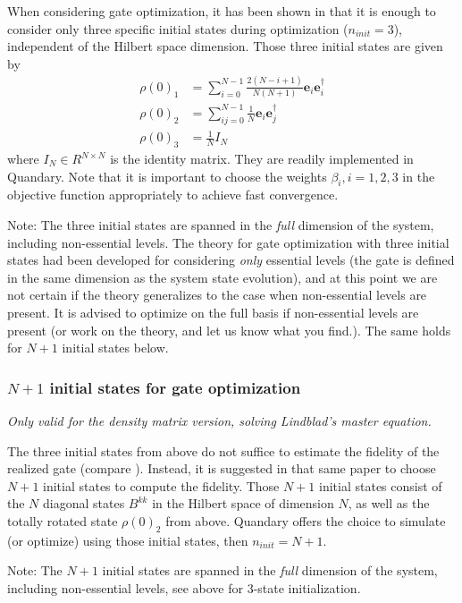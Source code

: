 \documentclass[11pt]{article}
\newcommand{\bs}[1]{{\boldsymbol{#1}}}
\begin{document}
When considering gate optimization, it has been shown in \cite{goerz2014optimal} that it is enough to consider only three specific initial states during optimization ($n_{init}=3$), independent of the Hilbert space dimension. Those three initial states are given by
\begin{align}
    \rho(0)_1 &= \sum_{i=0}^{N-1} \frac{2(N-i+1)}{N(N+1)} \bs{e}_i\bs{e}_i^\dagger \\
    \rho(0)_2 &= \sum_{ij=0}^{N-1} \frac{1}{N} \bs{e}_i\bs{e}_j^\dagger\\
    \rho(0)_3 &= \frac{1}{N} I_N
\end{align}
where $I_N\in R^{N\times N}$ is the identity matrix. They are readily implemented in Quandary. Note that it is important to choose the weights $\beta_i, i=1,2,3$ in the objective function appropriately to achieve fast convergence. 

Note: The three initial states are spanned in the \textit{full} dimension of the system, including non-essential levels. The theory for gate optimization with three initial states had been developed for considering \textit{only} essential levels (the gate is defined in the same dimension as the system state evolution), and at this point we are not certain if the theory generalizes to the case when non-essential levels are present. It is advised to optimize on the full basis if non-essential levels are present (or work on the theory, and let us know what you find.). The same holds for $N+1$ initial states below. 

\subsubsection{$N+1$ initial states for gate optimization}
\textit{Only valid for the density matrix version, solving Lindblad's master equation.}


The three initial states from above do not suffice to estimate the fidelity of the realized gate (compare \cite{goerz2014optimal}). Instead, it is suggested in that same paper to choose $N+1$ initial states to compute the fidelity. Those $N+1$ initial states consist of the $N$ diagonal states $B^{kk}$ in the Hilbert space of dimension $N$, as well as the totally rotated state $\rho(0)_2$ from above. Quandary offers the choice to simulate (or optimize) using those initial states, then $n_{init} = N+1$.

Note: The $N+1$ initial states are spanned in the \textit{full} dimension of the system, including non-essential levels, see above for 3-state initialization. 
\end{document}
